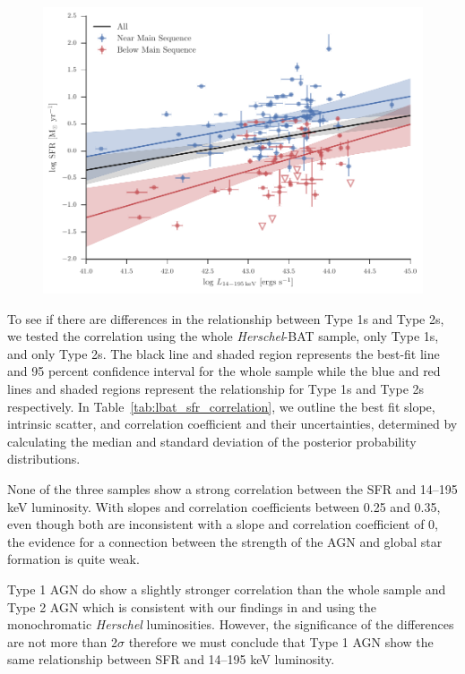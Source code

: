 \documentclass[fleqn, usenatbib]{mnras}
\newcommand{\herschel}{\emph{Herschel}}
\begin{document}
\begin{figure}
\includegraphics{figures/sfr_lbat_correlation_split_main_seqeunce}
\caption{\label{fig:sfr_lbat_correlation_ms}}
\end{figure}

To see if there are differences in the relationship between Type 1s and Type 2s, we tested the correlation using the whole \herschel-BAT sample, only Type 1s, and only Type 2s. The black line and shaded region represents the best-fit line and 95 percent confidence interval for the whole sample while the blue and red lines and shaded regions represent the relationship for Type 1s and Type 2s respectively. In Table~\ref{tab:lbat_sfr_correlation}, we outline the best fit slope, intrinsic scatter, and correlation coefficient and their uncertainties, determined by calculating the median and standard deviation of the posterior probability distributions. 

None of the three samples show a strong correlation between the SFR and 14--195 keV luminosity. With slopes and correlation coefficients between 0.25 and 0.35, even though both are inconsistent with a slope and correlation coefficient of 0, the evidence for a connection between the strength of the AGN and global star formation is quite weak. 

Type 1 AGN do show a slightly stronger correlation than the whole sample and Type 2 AGN which is consistent with our findings in \citet{Melendez:2014yu} and \citet{Shimizu:2016qy} using the monochromatic \herschel{} luminosities. However, the significance of the differences are not more than 2$\sigma$ therefore we must conclude that Type 1 AGN show the same relationship between SFR and 14--195 keV luminosity.
\end{document}
